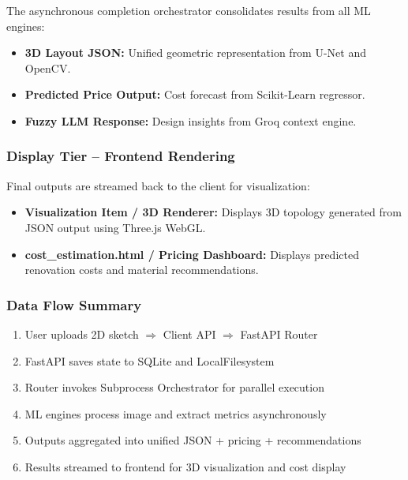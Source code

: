 \documentclass[12pt]{report}
\begin{document}
The asynchronous completion orchestrator consolidates results from all ML engines:

\begin{itemize}
  \item \textbf{3D Layout JSON:} Unified geometric representation from U-Net\cite{ronneberger2015} and OpenCV\cite{opencv2024}.
  \item \textbf{Predicted Price Output:} Cost forecast from Scikit-Learn regressor\cite{sklearn2024, wang2020}.
  \item \textbf{Fuzzy LLM Response:} Design insights from Groq context engine\cite{groq2024}.
\end{itemize}

\subsubsection{Display Tier -- Frontend Rendering}

Final outputs are streamed back to the client for visualization:

\begin{itemize}
  \item \textbf{Visualization Item / 3D Renderer:} Displays 3D topology generated from JSON output using Three.js WebGL\cite{threejs2024}.
  \item \textbf{cost\_estimation.html / Pricing Dashboard:} Displays predicted renovation costs and material recommendations\cite{wang2020}.
\end{itemize}

\subsubsection{Data Flow Summary}

\begin{enumerate}
  \item User uploads 2D sketch $\Rightarrow$ Client API $\Rightarrow$ FastAPI Router\cite{fastapi2024}
  \item FastAPI saves state to SQLite\cite{fastapi2024} and LocalFilesystem
  \item Router invokes Subprocess Orchestrator for parallel execution
  \item ML engines\cite{ronneberger2015, opencv2024, sklearn2024} process image and extract metrics asynchronously
  \item Outputs aggregated into unified JSON + pricing\cite{wang2020} + recommendations\cite{groq2024}
  \item Results streamed to frontend for 3D visualization\cite{threejs2024} and cost display
\end{enumerate}
\end{document}
